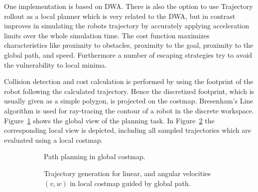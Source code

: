 One implementation is based on DWA.
There is also the option to use Trajectory rollout \cite{gerkey08planning} as a local planner which is very related to the DWA, but in contrast improves in simulating the robots trajectory by accurately applying acceleration limits over the whole simulation time.
The cost function maximizes characteristics like proximity to obstacles, proximity to the goal, proximity to the global path, and speed.
Furthermore a number of escaping strategies try to avoid the vulnerability to local minima. 

Collision detection and cost calculation is performed by using the footprint of the robot following the calculated trajectory.
Hence the discretized footprint, which is usually given as a simple polygon, is projected on the costmap. 
Bresenham's Line algorithm \cite{bresenham1965algorithm} is used for ray-tracing the contour of a robot in the discrete workspace. 
Figure~\ref{fig:fig_global} shows the global view of the planning task. 
In Figure~\ref{fig:fig_local} the corresponding local view is depicted, including all sampled trajectories which are evaluated using a local costmap.

\begin{figure}[thpb]
      \footnotesize
      \centering
    \begin{subfigure}[]{0.35\textwidth}
      \centering
      \def\svgwidth{0.8\textwidth}
      
      \caption{Path planning in global costmap.}
      \label{fig:fig_global}
    \end{subfigure}
   \begin{subfigure}[]{0.35\textwidth}
      \centering
      \def\svgwidth{0.8\textwidth}
      
      \caption{Trajectory generation for linear, and angular velocities $(v,w)$ in local costmap guided by global path.}
      \label{fig:fig_local}
   \end{subfigure}
   \caption{}
   \label{fig:fig_overview}
\end{figure}

%      
%
%      

